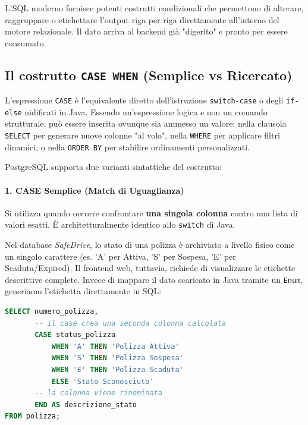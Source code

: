 L'SQL moderno fornisce potenti costrutti condizionali che permettono di alterare, raggruppare o etichettare l'output riga per riga direttamente all'interno del motore relazionale. Il dato arriva al backend già "digerito" e pronto per essere consumato.

\subsection{Il costrutto \texttt{CASE WHEN} (Semplice vs Ricercato)}
L'espressione \texttt{CASE} è l'equivalente diretto dell'istruzione \texttt{switch-case} o degli \texttt{if-else} nidificati in Java. Essendo un'espressione logica e non un comando strutturale, può essere inserita ovunque sia ammesso un valore: nella clausola \texttt{SELECT} per generare nuove colonne "al volo", nella \texttt{WHERE} per applicare filtri dinamici, o nella \texttt{ORDER BY} per stabilire ordinamenti personalizzati.

PostgreSQL supporta due varianti sintattiche del costrutto:

\paragraph{1. CASE Semplice (Match di Uguaglianza)}
Si utilizza quando occorre confrontare \textbf{una singola colonna} contro una lista di valori esatti. È architetturalmente identico allo \texttt{switch} di Java.

\begin{example}
Nel database \textit{SafeDrive}, lo stato di una polizza è archiviato a livello fisico come un singolo carattere (es. 'A' per Attiva, 'S' per Sospesa, 'E' per Scaduta/Expired). Il frontend web, tuttavia, richiede di visualizzare le etichette descrittive complete. Invece di mappare il dato scaricato in Java tramite un \texttt{Enum}, generiamo l'etichetta direttamente in SQL:

\begin{lstlisting}[language=SQL, basicstyle=\ttfamily\small, keywordstyle=\color{blue}\bfseries]
SELECT numero_polizza,
       -- il case crea una seconda colonna calcolata
       CASE status_polizza
           WHEN 'A' THEN 'Polizza Attiva'
           WHEN 'S' THEN 'Polizza Sospesa'
           WHEN 'E' THEN 'Polizza Scaduta'
           ELSE 'Stato Sconosciuto'
       -- la colonna viene rinominata    
       END AS descrizione_stato
FROM polizza;
\end{lstlisting}
\end{example}


